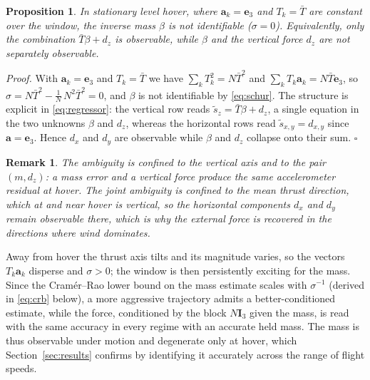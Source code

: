 \documentclass{ieeeaccess}
\newtheorem{proposition}{Proposition}
\newtheorem{remark}{Remark}
\renewenvironment{proof}{\noindent\textit{Proof.}}{\hfill$\square$\medskip}
\newcommand{\vect}[1]{\bm{#1}}
\newcommand{\mat}[1]{\mathbf{#1}}
\begin{document}
\begin{proposition}\label{prop:hover}
In stationary level hover, where $\vect{a}_k=\vect{e}_3$ and $T_k=\bar{T}$ are
constant over the window, the inverse mass $\beta$ is not identifiable
($\sigma=0$). Equivalently, only the combination $\bar{T}\beta+d_z$ is
observable, while $\beta$ and the vertical force $d_z$ are not separately
observable.
\end{proposition}
\begin{proof}
With $\vect{a}_k=\vect{e}_3$ and $T_k=\bar{T}$ we have $\sum_k T_k^2=N\bar{T}^2$
and $\sum_k T_k\vect{a}_k=N\bar{T}\vect{e}_3$, so
$\sigma = N\bar{T}^2-\tfrac{1}{N}\,N^2\bar{T}^2 = 0$, and $\beta$ is not
identifiable by \eqref{eq:schur}. The structure is explicit in
\eqref{eq:regressor}: the vertical row reads
$\tilde{s}_z=\bar{T}\beta+d_z$, a single equation in the two unknowns
$\beta$ and $d_z$, whereas the horizontal rows read
$\tilde{s}_{x,y}=d_{x,y}$ since $\vect{a}=\vect{e}_3$. Hence $d_x$ and $d_y$ are
observable while $\beta$ and $d_z$ collapse onto their sum.
\end{proof}

\begin{remark}
The ambiguity is confined to the vertical axis and to the pair $(m,d_z)$: a
mass error and a vertical force produce the same accelerometer residual at
hover. The joint ambiguity is confined to the mean thrust direction, which at
and near hover is vertical, so the horizontal components $d_x$ and $d_y$ remain
observable there, which is why the external force is recovered in the directions
where wind dominates.
\end{remark}

Away from hover the thrust axis tilts and its magnitude varies, so the vectors
$T_k\vect{a}_k$ disperse and $\sigma>0$; the window is then persistently exciting for
the mass. Since the Cram\'er--Rao lower bound on
the mass estimate scales with $\sigma^{-1}$ (derived in \eqref{eq:crb} below), a
more aggressive trajectory admits a better-conditioned estimate, while the force,
conditioned by the block
$N\mat{I}_3$ given the mass, is read with the same accuracy in every regime with
an accurate held mass. The mass is thus
observable under motion and degenerate only at hover, which
Section~\ref{sec:results} confirms by identifying it accurately across the range
of flight speeds.
\end{document}
